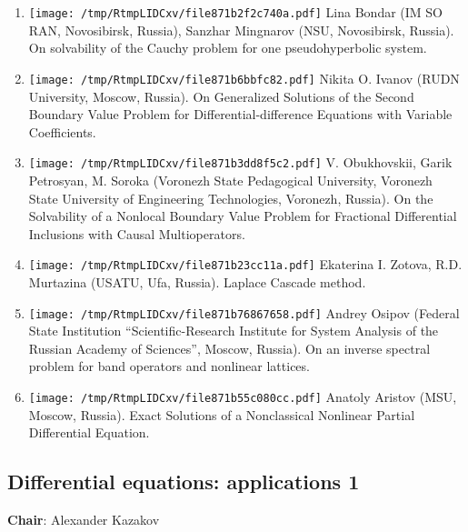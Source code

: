 \documentclass[
]{article}
\providecommand{\tightlist}{%
  \setlength{\itemsep}{0pt}\setlength{\parskip}{0pt}}
\begin{document}
\begin{enumerate}
\def\labelenumi{\arabic{enumi}.}
\tightlist
\item
  \protect\texttt{[image: /tmp/RtmpLIDCxv/file871b2f2c740a.pdf]}
  Lina Bondar (IM SO RAN, Novosibirsk, Russia), Sanzhar Mingnarov (NSU,
  Novosibirsk, Russia). On solvability of the Cauchy problem for one
  pseudohyperbolic system.
\item
  \protect\texttt{[image: /tmp/RtmpLIDCxv/file871b6bbfc82.pdf]}
  Nikita O. Ivanov (RUDN University, Moscow, Russia). On Generalized
  Solutions of the Second Boundary Value Problem for
  Differential-difference Equations with Variable Coefficients.
\item
  \protect\texttt{[image: /tmp/RtmpLIDCxv/file871b3dd8f5c2.pdf]}
  V. Obukhovskii, Garik Petrosyan, M. Soroka (Voronezh State Pedagogical
  University, Voronezh State University of Engineering Technologies,
  Voronezh, Russia). On the Solvability of a Nonlocal Boundary Value
  Problem for Fractional Differential Inclusions with Causal
  Multioperators.
\item
  \protect\texttt{[image: /tmp/RtmpLIDCxv/file871b23cc11a.pdf]}
  Ekaterina I. Zotova, R.D. Murtazina (USATU, Ufa, Russia). Laplace
  Cascade method.
\item
  \protect\texttt{[image: /tmp/RtmpLIDCxv/file871b76867658.pdf]}
  Andrey Osipov (Federal State Institution ``Scientific-Research
  Institute for System Analysis of the Russian Academy of Sciences'',
  Moscow, Russia). On an inverse spectral problem for band operators and
  nonlinear lattices.
\item
  \protect\texttt{[image: /tmp/RtmpLIDCxv/file871b55c080cc.pdf]}
  Anatoly Aristov (MSU, Moscow, Russia). Exact Solutions of a
  Nonclassical Nonlinear Partial Differential Equation.
\end{enumerate}

\hypertarget{dea1}{%
\subsection{Differential equations: applications 1}\label{dea1}}

\textbf{Chair}: Alexander Kazakov
\end{document}
